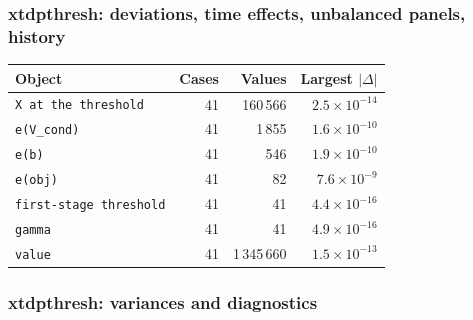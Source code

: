 \subsubsection*{xtdpthresh: deviations, time effects, unbalanced panels, history}

\begin{longtable}{@{}p{8.2cm}rrr@{}}
\toprule
Object & Cases & Values & Largest $|\Delta|$ \\
\midrule
\endhead
\texttt{X at the threshold} & 41 & 160\,566 & $2.5\times10^{-14}$ \\
\texttt{e(V\_\allowbreak{}cond)} & 41 & 1\,855 & $1.6\times10^{-10}$ \\
\texttt{e(b)} & 41 & 546 & $1.9\times10^{-10}$ \\
\texttt{e(obj)} & 41 & 82 & $7.6\times10^{-9}$ \\
\texttt{first-stage threshold} & 41 & 41 & $4.4\times10^{-16}$ \\
\texttt{gamma} & 41 & 41 & $4.9\times10^{-16}$ \\
\texttt{value} & 41 & 1\,345\,660 & $1.5\times10^{-13}$ \\
\bottomrule
\end{longtable}

\subsubsection*{xtdpthresh: variances and diagnostics}


